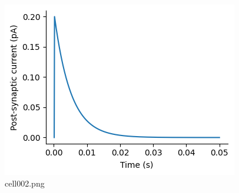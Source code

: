 \begin{figure}[ht]
	\centering
	\includegraphics[scale=0.8, max width=\linewidth]{./fig/synapse-model/kinetic-synapse/cell002.png}
	\caption{cell002.png}
	\label{cell002.png}
\end{figure}